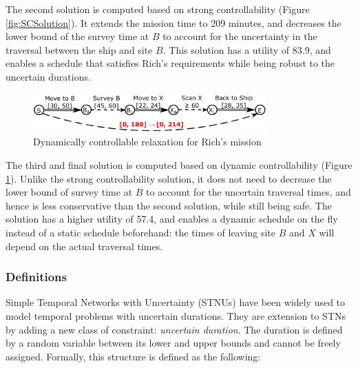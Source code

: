 \documentclass[jair,twoside,11pt,theapa]{article}
\begin{document}
The second solution is computed based on strong controllability (Figure
\ref{fig:SCSolution}). It extends the mission time to 209 minutes, and decreases
the lower bound of the survey time at $B$ to account for the uncertainty in
the traversal between the ship and site $B$. This solution has a utility of
83.9, and enables a schedule that satisfies Rich's requirements while being robust to
the uncertain durations.

\begin{figure}[ht!]
	\centering
	\includegraphics[width=0.8\textwidth]{figures/solution_dc.pdf} 
	\caption{Dynamically controllable relaxation for Rich's mission}
	\label{fig:DCSolution}
\end{figure}

The third and final solution is computed based on dynamic controllability
(Figure \ref{fig:DCSolution}). Unlike the strong controllability solution, it
does not need to decrease the lower bound of survey time at $B$ to account for
the uncertain traversal times, and hence is less conservative than the second
solution, while still being safe. The solution has a higher utility of 57.4, and
enables a dynamic schedule on the fly instead of a static schedule beforehand:
the times of leaving site $B$ and $X$ will depend on the actual traversal times.


\subsubsection{Definitions}

Simple Temporal Networks with Uncertainty (STNUs)
\cite<STNUs,>{Vidal99handlingcontingency} have been widely used to model temporal
problems with uncertain durations. They are extension to STNs by adding a new
class of constraint: \textit{uncertain duration}. The duration is defined by a
random variable between its lower and upper bounds and cannot be freely
assigned. Formally, this structure is defined as the following:
\end{document}
